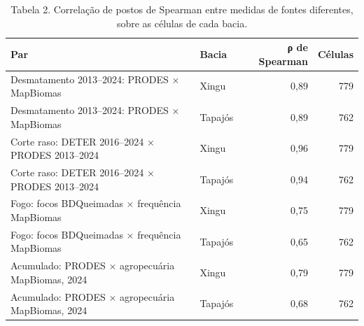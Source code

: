 \begin{table}
\caption{Tabela 2. Correlação de postos de Spearman entre medidas de fontes diferentes, sobre as células de cada bacia.}
\label{tab:04_perturbacao::concordancia}
\begin{tabular}{llrr}
\toprule
Par & Bacia & ρ de Spearman & Células \\
\midrule
Desmatamento 2013–2024: PRODES × MapBiomas & Xingu & 0,89 & 779 \\
Desmatamento 2013–2024: PRODES × MapBiomas & Tapajós & 0,89 & 762 \\
Corte raso: DETER 2016–2024 × PRODES 2013–2024 & Xingu & 0,96 & 779 \\
Corte raso: DETER 2016–2024 × PRODES 2013–2024 & Tapajós & 0,94 & 762 \\
Fogo: focos BDQueimadas × frequência MapBiomas & Xingu & 0,75 & 779 \\
Fogo: focos BDQueimadas × frequência MapBiomas & Tapajós & 0,65 & 762 \\
Acumulado: PRODES × agropecuária MapBiomas, 2024 & Xingu & 0,79 & 779 \\
Acumulado: PRODES × agropecuária MapBiomas, 2024 & Tapajós & 0,68 & 762 \\
\bottomrule
\end{tabular}
\end{table}
